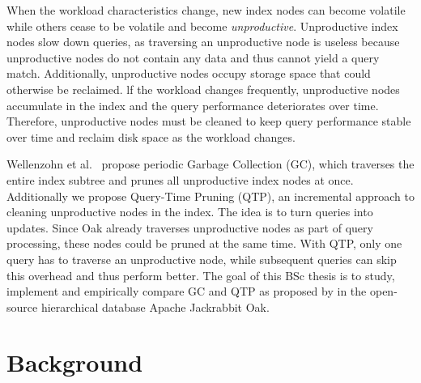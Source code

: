 \documentclass[abstracton,12pt]{scrartcl}
\theoremstyle{definition}
\begin{document}
When the workload characteristics change, new index nodes can become volatile
while others cease to be volatile and become \textit{unproductive}. Unproductive
index nodes slow down queries, as traversing an unproductive node is useless
because unproductive nodes do not contain any data 
and thus cannot yield a query match. Additionally, unproductive nodes
occupy storage space that could otherwise be reclaimed. lf the workload changes
frequently, unproductive nodes accumulate in the index and the query
performance deteriorates over time. Therefore, unproductive nodes must be
cleaned to keep query performance stable over time and reclaim disk space as
the workload changes.

Wellenzohn et al.~\cite{KW17} propose periodic Garbage Collection (GC), which
traverses the entire index subtree and prunes all unproductive index nodes at
once. Additionally we propose Query-Time Pruning (QTP), an incremental approach
to cleaning unproductive nodes in the index. The idea is to turn queries into
updates. Since Oak already traverses unproductive nodes as part of query
processing, these nodes could be pruned at the same time. 
With QTP, only one query has to traverse an unproductive node, while subsequent
queries can skip this overhead and thus perform better.
The goal of this BSc thesis is to study, implement and empirically compare GC
and QTP as proposed by \cite{KW17} in the open-source hierarchical 
database Apache Jackrabbit Oak.


\section{Background}



\end{document}
